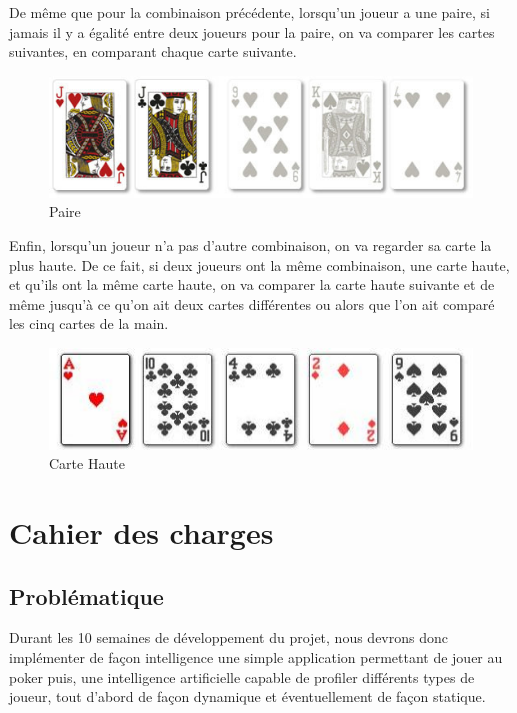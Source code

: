 \documentclass{report}
\begin{document}
De même que pour la combinaison précédente, lorsqu'un joueur a une paire, si jamais il y a égalité entre deux joueurs pour la paire, on va comparer les cartes suivantes, en comparant chaque carte suivante. \par
\newpage
		\begin{figure}[h]
			\begin{center}
				\includegraphics[scale=0.3]{./imagesRapport/paire.jpg}
			\end{center}
			\caption[Paire]{Paire}
		\end{figure}
		\medskip


Enfin, lorsqu'un joueur n'a pas d'autre combinaison, on va regarder sa carte la plus haute. De ce fait, si deux joueurs ont la même combinaison, une carte haute, et qu'ils ont la même carte haute, on va comparer la carte haute suivante et de même jusqu'à ce qu'on ait deux cartes différentes ou alors que l'on ait comparé les cinq cartes de la main. \par
		\begin{figure}[h]
			\begin{center}
				\includegraphics[scale=0.4]{./imagesRapport/carteHaute.jpg}
			\end{center}
			\caption[Carte Haute]{Carte Haute}
		\end{figure}
		\medskip

\section{Cahier des charges}
\subsection{Problématique}
\hspace{0.5cm}Durant les 10 semaines de développement du projet, nous devrons donc implémenter de façon intelligence une simple application permettant de jouer au poker puis, une intelligence artificielle capable de profiler différents types de joueur, tout d'abord de façon dynamique et éventuellement de façon statique. 
\end{document}
